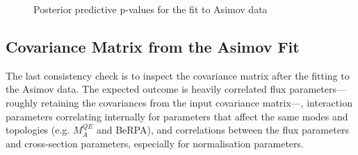 \begin{figure}[h]
\begin{subfigure}[t]{0.49\textwidth}
	\end{subfigure}
\caption{Posterior predictive p-values for the fit to Asimov data}
\label{fig:posterior_predictive_asimov}
\end{figure}

\subsection{Covariance Matrix from the Asimov Fit}
\label{sec:covariance_asimov}
The last consistency check is to inspect the covariance matrix after the fitting to the Asimov data. The expected outcome is heavily correlated flux parameters---roughly retaining the covariances from the input covariance matrix---, interaction parameters correlating internally for parameters that affect the same modes and topologies (e.g. $M_A^{QE}$ and BeRPA), and correlations between the flux parameters and cross-section parameters, especially for normalisation parameters.

